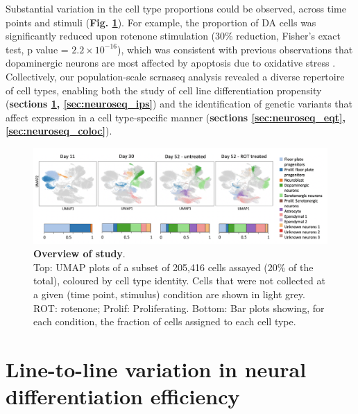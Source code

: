 Substantial variation in the cell type proportions could be observed, across time points and stimuli (\textbf{Fig. \ref{fig:neuroseq_overview}}). 
For example, the proportion of DA cells was significantly reduced upon rotenone stimulation (30\% reduction, Fisher’s exact test, p value = $2.2 \times 10^{-16}$), which was consistent with previous observations that dopaminergic neurons are most affected by apoptosis due to oxidative stress \cite{sherer2003mechanism, knonagel1992autologous, cannon2009highly}.
Collectively, our population-scale \gls{scrnaseq} analysis revealed a diverse repertoire of cell types, enabling both the study of cell line differentiation propensity (\textbf{sections \ref{sec:neuroseq_diff_eff}, \ref{sec:neuroseq_ips}}) and the identification of genetic variants that affect expression in a cell type-specific manner (\textbf{sections \ref{sec:neuroseq_eqt}, \ref{sec:neuroseq_coloc}}). 
\\ 

\begin{figure}[h]
\centering
\includegraphics[width=17cm]{Chapter5/Fig/neuroseq_overview.png}
\caption[Overview of study]{\textbf{Overview of study}.\\
Top: UMAP plots of a subset of 205,416 cells assayed (20\% of the total), coloured by cell type identity. 
Cells that were not collected at a given (time point, stimulus) condition are shown in light grey. 
ROT: rotenone; Prolif: Proliferating. 
Bottom: Bar plots showing, for each condition, the fraction of cells assigned to each cell type.}
\label{fig:neuroseq_overview}
\end{figure}

\newpage

\section{Line-to-line variation in neural differentiation efficiency}
\label{sec:neuroseq_diff_eff}

